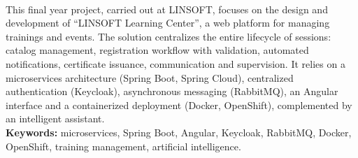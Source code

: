 \documentclass[12pt,a4paper,oneside]{report}
\begin{document}
\vspace{1.2cm}
\\[0.3cm]
\noindent This final year project, carried out at LINSOFT, focuses on the design and
development of “LINSOFT Learning Center”, a web platform for managing trainings and events. The
solution centralizes the entire lifecycle of sessions: catalog management, registration
workflow with validation, automated notifications, certificate issuance, communication and
supervision. It relies on a microservices architecture (Spring Boot, Spring Cloud), centralized
authentication (Keycloak), asynchronous messaging (RabbitMQ), an Angular interface and a
containerized deployment (Docker, OpenShift), complemented by an intelligent assistant.\\[0.3cm]
\noindent\textbf{Keywords:} microservices, Spring Boot, Angular, Keycloak, RabbitMQ, Docker, OpenShift,
training management, artificial intelligence.
\end{document}
